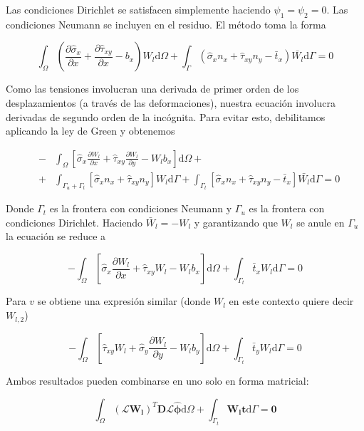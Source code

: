 \documentclass{article}
\def\domega{\mbox{d}\Omega}
\def\dgamma{\mbox{d}\Gamma}
\def\partialx#1{\frac{\partial #1}{\partial x}}
\def\partialy#1{\frac{\partial #1}{\partial y}}
\def\hatsigmax{\hat{\sigma}_x}
\def\hatsigmay{\hat{\sigma}_y}
\def\hattauxy{\hat{\tau}_{xy}}
\begin{document}
\begin{enumerate}[1)]
{        Las condiciones Dirichlet se satisfacen simplemente haciendo $\psi_1 = \psi_2 = 0$. Las
        condiciones Neumann se incluyen en el residuo. El método toma la forma

        \[ 
            \int_\Omega \left( \partialx{\hatsigmax} + \partialx{\hattauxy} - b_x \right) W_l \domega 
            +
            \int_\Gamma \left( \hatsigmax n_x + \hattauxy n_y - \bar{t}_x \right) \bar{W_l} \dgamma = 0
        \]

        Como las tensiones involucran una derivada de primer orden de los desplazamientos (a través
        de las deformaciones), nuestra ecuación involucra derivadas de segundo orden de la incógnita.
        Para evitar esto, debilitamos aplicando la ley de Green y obtenemos

        \begin{eqnarray*}
            &-&\int_\Omega \left[ 
            \hatsigmax \partialx{W_l} + \hattauxy \partialy{W_l} - W_l b_x
            \right] \domega + \\
            &+&
            \int_{\Gamma_u + \Gamma_t} \left[ 
            \hatsigmax n_x + \hattauxy n_y
            \right] W_l \dgamma
            +
            \int_{\Gamma_t} \left[ 
            \hatsigmax n_x + \hattauxy n_y - \bar{t}_x
            \right] \bar{W_l} \dgamma
            = 0
        \end{eqnarray*}

        Donde $\Gamma_t$ es la frontera con condiciones Neumann y $\Gamma_u$ es la frontera con
        condiciones Dirichlet. Haciendo $\bar{W}_l = - W_l$ y garantizando que $W_l$ se anule
        en $\Gamma_u$ la ecuación se reduce a

        \[
            -\int_\Omega \left[ 
            \hatsigmax \partialx{W_l} + \hattauxy{W_l} - W_l b_x
            \right] \domega
            +
            \int_{\Gamma_t} \bar{t}_x W_l \dgamma = 0
        \]

        Para $v$ se obtiene una expresión similar (donde $W_l$ en este contexto quiere decir
        $W_{l,2}$)

        \[
            -\int_\Omega \left[ 
            \hattauxy{W_l} + \hatsigmay \partialy{W_l} - W_l b_y
            \right] \domega
            +
            \int_{\Gamma_t} \bar{t}_y W_l \dgamma = 0
        \]

        Ambos resultados pueden combinarse en uno solo en forma matricial:

        \[
            \int_\Omega 
            \left(\boldsymbol{\mathcal{L}} \boldsymbol{W_l}\right)^T
            \boldsymbol{D} \boldsymbol{\mathcal{L}} \boldsymbol{\hat{\phi}} \domega
            +
            \int_{\Gamma_t} \boldsymbol{W_l} \boldsymbol{t} \dgamma = \boldsymbol{0}
        \]

}
\end{enumerate}
\end{document}
